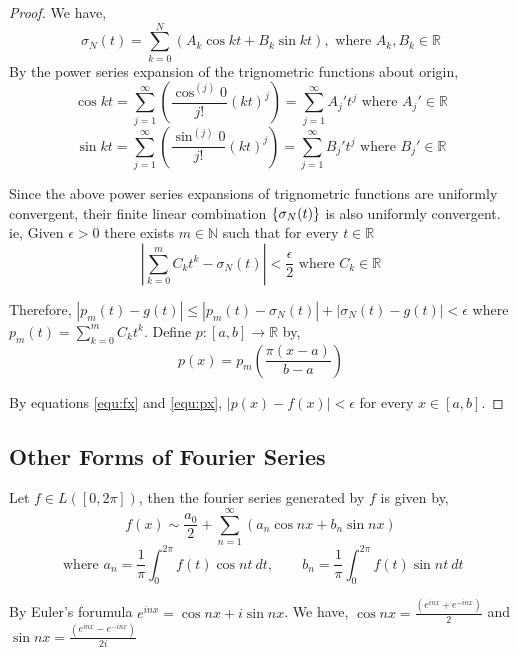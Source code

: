 \begin{proof}
		We have,
		\begin{equation}
			\sigma_N(t) = \sum_{k=0}^N \left(A_k \cos kt + B_k \sin kt \right),\text{ where } A_k, B_k \in \mathbb{R}
			\label{equ:sigmaN}
		\end{equation}
		By the power series expansion of the trignometric functions about origin,
		\begin{equation}
			\cos kt = \sum_{j = 1}^\infty \left(\frac{\cos^{(j)} 0}{j!} (kt)^j \right)  = \sum_{j = 1}^\infty A_j' t^j \text{ where } A_j' \in \mathbb{R}
			\label{equ:coskt}
		\end{equation}
		\begin{equation}
			\sin kt = \sum_{j = 1}^\infty \left(\frac{\sin^{(j)} 0}{j!} (kt)^j \right)  = \sum_{j = 1}^\infty B_j' t^j \text{ where } B_j' \in \mathbb{R}
			\label{equ:sinkt}
		\end{equation}

		Since the above power series expansions of trignometric functions are uniformly convergent, their finite linear combination \(\{\sigma_N(t)\}\) is also uniformly convergent.
		ie, Given \(\epsilon > 0\) there exists \(m \in \mathbb{N}\) such that for every \(t \in \mathbb{R}\)
		\[\left|\sum_{k = 0}^m C_k t^k - \sigma_N(t)\right| < \frac{\epsilon}{2} \text{ where } C_k \in \mathbb{R}\]

		Therefore, \(| p_m(t) - g(t)| \le | p_m(t) - \sigma_N(t) | + |\sigma_N(t) - g(t)| < \epsilon\) where \(p_m(t) = \sum_{k = 0}^m C_k t^k\).
		Define \(p : [a,b] \to \mathbb{R}\) by,
		\begin{equation}
			p(x) = p_m\left( \frac{\pi(x-a)}{b-a} \right)
			\label{equ:px}
		\end{equation}

		By equations \ref{equ:fx} and \ref{equ:px}, \(|p(x)-f(x)| < \epsilon\) for every \(x \in [a,b]\).
	\end{proof}
\subsection{Other Forms of Fourier Series}
	Let \(f \in L([0,2\pi])\), then the fourier series generated by $f$ is given by,
	\[ f(x) \sim \frac{a_0}{2}+\sum_{n=1}^\infty \left( a_n \cos nx + b_n \sin nx \right) \]
	\[ \text{ where } a_n = \frac{1}{\pi} \int_0^{2\pi} f(t) \cos nt\ dt,\qquad b_n = \frac{1}{\pi} \int_0^{2\pi} f(t) \sin nt\ dt \]

	By Euler's forumula \(e^{inx} = \cos nx + i\sin nx\).
	We have, \(\cos nx = \frac{(e^{inx}+e^{-inx})}{2}\) and \(\sin nx = \frac{(e^{inx}-e^{-inx})}{2i}\)

